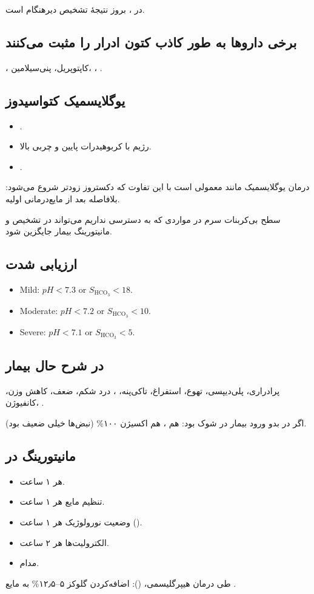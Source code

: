 \documentclass[12pt,a4paper]{article}
\begin{document}
در ، بروز  نتیجهٔ تشخیص دیرهنگام  است.
\subsection*{برخی داروها به طور کاذب کتون ادرار را مثبت می‌کنند}
، کاپتوپریل، پنی‌سیلامین، ، .

\subsection*{یوگلایسمیک کتواسیدوز}
\begin{itemize}
\item {}.
\item رژیم با کربوهیدرات پایین و چربی بالا.
\item {}.
\end{itemize}
درمان یوگلایسمیک  مانند  معمولی است با این تفاوت که دکستروز زودتر شروع می‌شود: بلافاصله بعد از مایع‌درمانی اولیه.

سطح بی‌کربنات سرم در مواردی که به  دسترسی نداریم می‌تواند در تشخیص و مانیتورینگ بیمار جایگزین  شود.
\subsection*{ارزیابی شدت }
\begin{latin}
\begin{itemize}
\item Mild: \(pH<7.3\) or \(S_{\mathrm{HCO}_3}<18\).
\item Moderate: \(pH<7.2\) or \(S_{\mathrm{HCO}_3}<10\).
\item Severe: \(pH<7.1\) or \(S_{\mathrm{HCO}_3}<5\).
\end{itemize}
\end{latin}
\subsection*{در شرح حال بیمار }
پرادراری، پلی‌دیپسی، تهوع، استفراغ، تاکی‌پنه، ، درد شکم، ضعف، کاهش وزن، کانفیوژن، .

اگر در بدو ورود بیمار در شوک بود: هم ، هم اکسیژن ۱۰۰\% (نبض‌ها خیلی ضعیف بود).

\subsection*{مانیتورینگ در }
\begin{itemize}
\item {} هر ۱ ساعت.
\item تنظیم مایع هر ۱ ساعت.
\item وضعیت نورولوژیک هر ۱ ساعت ().
\item الکترولیت‌ها هر ۲ ساعت.
\item {} مدام.
\end{itemize}
طی درمان هیپرگلیسمی،  (): اضافه‌کردن گلوکز ۵–۱۲٫۵\% به مایع .
\end{document}
